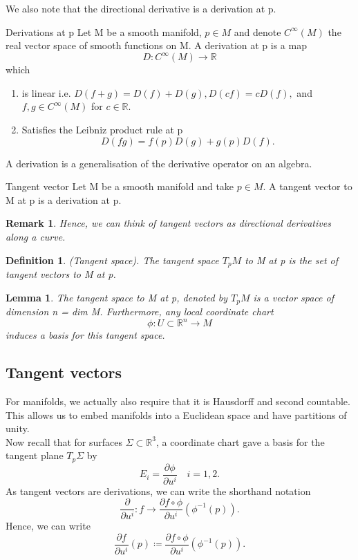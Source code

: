 \documentclass[twoside]{article}
\newtheorem{lemma}[theorem]{Lemma}
\newtheorem{definition}[theorem]{Definition}
\newtheorem{remark}[theorem]{Remark}
\begin{document}
We also note that the directional derivative is a derivation at p.

\begin{definition_exam}{Derivations at p}{} Let M be a smooth manifold, $p \in M$ and denote $C^{\infty}(M)$ the real vector space of smooth functions on M. A derivation at p is a map 
$$
D: C^{\infty}(M) \rightarrow \mathbb{R}
$$
which 
\begin{enumerate}
\item is linear i.e. $D(f+g) = D(f) + D(g), D(cf) = cD(f),$ and $f, g \in C^{\infty}(M)$ for $c \in \mathbb{R}$.
\item Satisfies the Leibniz product rule at p $$D(fg) = f(p)D(g) + g(p)D(f).$$
\end{enumerate}
\end{definition_exam}

A derivation is a generalisation of the derivative operator on an algebra.

\begin{definition_exam}{Tangent vector}{} Let M be a smooth manifold and take $p \in M.$ A tangent vector to M at p is a derivation at p.
\end{definition_exam}

\begin{remark}Hence, we can think of tangent vectors as directional derivatives along a curve.
\end{remark}

\begin{definition}(Tangent space). The tangent space $T_pM$ to M at p is the set of tangent vectors to M at p.
\end{definition}

\begin{lemma}The tangent space to M at p, denoted by $T_pM$ is a vector space of dimension n = dim M. Furthermore, any local coordinate chart 
$$
\phi: U \subset \mathbb{R}^n \rightarrow M
$$
induces a basis for this tangent space.
\end{lemma}

\subsection{Tangent vectors}

For manifolds, we actually also require that it is Hausdorff and second countable. This allows us to embed manifolds into a Euclidean space and have partitions of unity.\\
Now recall that for surfaces $\Sigma \subset \mathbb{R}^3$, a coordinate chart gave a basis for the tangent plane $T_p\Sigma$ by 
$$
E_i = \frac{\partial \phi}{\partial u^i} \quad i=1,2.
$$
As tangent vectors are derivations, we can write the shorthand notation 
$$
\frac{\partial}{\partial u^i}: f \rightarrow \frac{\partial f \circ \phi}{\partial u^i}(\phi^{-1}(p)).
$$
Hence, we can write 
$$
\frac{\partial f}{\partial u^i}(p) \coloneqq \frac{\partial f \circ \phi}{\partial u^i}(\phi^{-1}(p)).
$$
\end{document}
